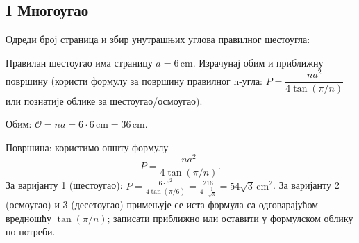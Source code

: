 \documentclass[10pt,a5paper,addpoints]{exam}
\newcommand{\measure}[2]{#1\,\mathrm{#2}}
\def\variant#1#2#3{#1}
\begin{document}
\begin{questions}

\section*{I Многоугао}

\question[3]
Одреди број страница и збир унутрашњих углова правилног \variant{шестоугла}{осмоугла}{десетоугла}:

\begin{solution}
\end{solution}

\question[3]
Правилан \variant{шестоугао}{осмоугао}{десетоугао} има страницу \(a=\measure{\variant{6}{4}{3}}{cm}\). Израчунај обим и приближну површину (користи формулу за површину правилног n-угла: \(P = \dfrac{n a^2}{4\tan(\pi/n)}\) или познатије облике за шестоугао/осмоугао).
\begin{solution}
Обим: $\mathcal{O} = n a = \variant{6\cdot 6}{8\cdot 4}{10\cdot 3}\,\mathrm{cm}
= \measure{\variant{36}{32}{30}}{cm}.$

Површина: користимо општу формулу
\[
P=\frac{n a^2}{4\tan(\pi/n)}.
\]
За варијанту 1 (шестоугао): $P = \frac{6\cdot 6^2}{4\tan(\pi/6)} = \frac{216}{4\cdot \tfrac{1}{\sqrt3}} = 54\sqrt3 \,\mathrm{cm}^2$.  
За варијанту 2 (осмоугао) и 3 (десетоугао) примењује се иста формула са одговарајућом вредношћу $\tan(\pi/n)$; записати приближно или оставити у формулском облику по потреби.
\end{solution}


\end{questions}
\end{document}
